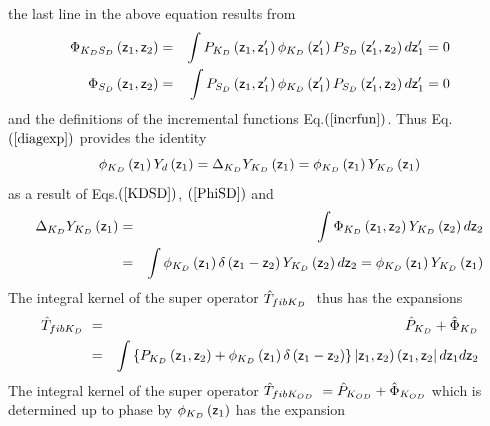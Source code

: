 the last line in the above equation results from 
\begin{eqnarray}
\Phi _{K_{D}S_{D}}\left( {\sf z}_{1},{\sf z}_{2}\right) &=&\int
P_{K_{D}}\left( {\sf z}_{1},{\sf z}_{1}^{\prime }\right) \phi _{K_{D}}\left( 
{\sf z}_{1}^{\prime }\right) P_{S_{D}}\left( {\sf z}_{1}^{\prime },{\sf z}%
_{2}\right) d{\sf z}_{1}^{\prime }=0  \label{KDSD} \\
\Phi _{S_{D}}\left( {\sf z}_{1},{\sf z}_{2}\right) &=&\int P_{S_{D}}\left( 
{\sf z}_{1},{\sf z}_{1}^{\prime }\right) \phi _{K_{D}}\left( {\sf z}%
_{1}^{\prime }\right) P_{S_{D}}\left( {\sf z}_{1}^{\prime },{\sf z}%
_{2}\right) d{\sf z}_{1}^{\prime }=0  \label{PhiSD}
\end{eqnarray}%
and the definitions of the incremental functions Eq.$\left( \ref{incrfun}%
\right) $. Thus Eq.$\left( \ref{diagexp}\right) $ provides the identity 
\begin{equation}
\phi _{K_{D}}\left( {\sf z}_{1}\right) Y_{d}\left( {\sf z}_{1}\right)
=\Delta _{K_{D}}Y_{K_{D}}\left( {\sf z}_{1}\right) =\phi _{K_{D}}\left( {\sf %
z}_{1}\right) Y_{K_{D}}\left( {\sf z}_{1}\right)
\end{equation}%
as a result of Eqs.$\left( \ref{KDSD}\right) $, $\left( \ref{PhiSD}\right) $
and 
\begin{eqnarray}
\Delta _{K_{D}}Y_{K_{D}}\left( {\sf z}_{1}\right) &=&\int \Phi
_{K_{D}}\left( {\sf z}_{1},{\sf z}_{2}\right) Y_{K_{D}}\left( {\sf z}%
_{2}\right) d{\sf z}_{2}  \nonumber \\
&=&\int \phi _{K_{D}}\left( {\sf z}_{1}\right) \delta \left( {\sf z}_{1}-%
{\sf z}_{2}\right) Y_{K_{D}}\left( {\sf z}_{2}\right) d{\sf z}_{2}=\phi
_{K_{D}}\left( {\sf z}_{1}\right) Y_{K_{D}}\left( {\sf z}_{1}\right)
\end{eqnarray}%
The integral kernel of the super operator $\hat{T}_{fibK_{D}{\rm \ }}$ thus
has the expansions 
\begin{eqnarray}
\hat{T}_{fibK_{D}{\rm \ }} &=&\hat{P}_{K_{D}}+\hat{\Phi}_{K_{D}} \\
&=&\int \left\{ P_{K_{D}}\left( {\sf z}_{1},{\sf z}_{2}\right) +\phi
_{K_{D}}\left( {\sf z}_{1}\right) \delta \left( {\sf z}_{1}-{\sf z}%
_{2}\right) \right\} \left| {\sf z}_{1},{\sf z}_{2}\right) \left( {\sf z}%
_{1},{\sf z}_{2}\right| d{\sf z}_{1}d{\sf z}_{2}
\end{eqnarray}%
The integral kernel of the super operator $\hat{T}_{fibK_{OD}{\rm \ }}=\hat{P%
}_{K_{OD}}+\hat{\Phi}_{K_{OD}}$ which is determined up to phase by $\phi
_{K_{D}}\left( {\sf z}_{1}\right) $ has the expansion 
